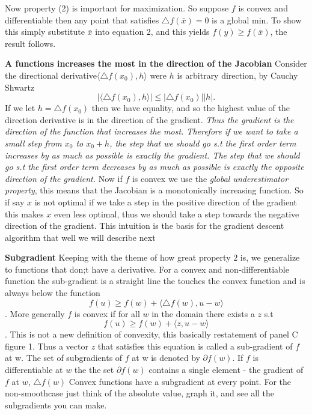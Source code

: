 \documentclass[11pt]{article}
\theoremstyle{quest}
\begin{document}
Now property (2) is important  for maximization. So suppose $f$ is convex and differentiable then any point that satisfies $\triangle f(\bar{x})=0$ is a global min. To show this simply substitute  $\bar{x}$ into  equation 2, and this yields $f(y)\ge f(\bar{x})$, the result follows. 

\textbf{A functions increases the most in the direction of the Jacobian}
Consider the directional derivative$\langle \triangle f(x_0), h\rangle$  were $h$ is arbitrary direction, by Cauchy Shwartz \[|\langle \triangle f(x_0), h\rangle|\le |\triangle f(x_0)||h|.\] If we let $h=\triangle f(x_0)$ then we have equality, and so the highest value of the direction derivative is in the direction of the gradient. \textit{Thus the gradient is the direction of the function that increases the most. Therefore if we want to take a small step from $x_0$ to $x_0+h$, the step that we should go s.t the first order term increases by as much as possible is exactly the gradient. The step that we should go s.t the first order term decreases by as much as possible is exactly the opposite direction of the gradient. } Now if $f$ is convex we use the \textit{global underestimator property}, this means  that the Jacobian is a monotonically increasing function. So if say $x$ is not optimal if we take a step in the positive direction of the gradient this makes $x$ even less optimal, thus we should take a step towards the negative direction of the gradient. This intuition is the basis for the gradient descent algorithm that well we will describe next 

\textbf{Subgradient} Keeping with the theme of how great property $2$ is, we generalize to functions that don;t have a derivative. For a convex and non-differentiable function the sub-gradient is a straight line the touches the convex function and is always below the function
$$f(u)\ge f(w)+\langle \triangle f(w), u-w\rangle $$. More generally $f$ is convex if for all $w$ in the domain there exists a $z$ s.t $$f(u)\ge f(w)+\langle z , u-w\rangle $$. This is not a new definition of convexity, this basically restatement of panel C figure 1. Thus a vector $z$ that satisfies this equation is called a sub-gradient of $f$ at w. The set of subgradients of $f$ at w is denoted by $\partial f(w)$. If $f$ is differentiable at $w$ the the set $\partial f(w)$ contains a single element - the gradient of $f$ at $w$, $\triangle f(w)$
Convex functions have a subgradient at every point. For the non-smoothcase just think of the absolute value, graph it, and see all the subgradients you can make. 
\end{document}
